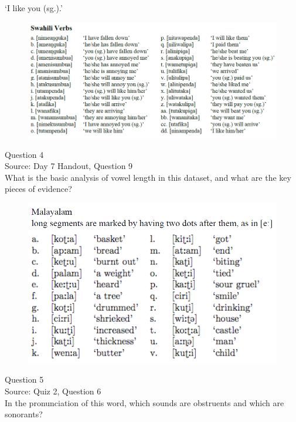 \documentclass[12pt]{article}
\begin{document}
‘I like you (sg.).’

\begin{figure}[H]
\includegraphics{../images/swahiliverbs.png}
\end{figure}

\newpage

{\large Question 4}\\

Source: Day 7 Handout, Question 9\\

What is the basic analysis of vowel length in this dataset, and what are the key pieces of evidence?\\

\begin{figure}[H]
\includegraphics{../images/malayalam.png}
\end{figure}

\newpage

{\large Question 5}\\

Source: Quiz 2, Question 6\\

In the pronunciation of this word, which sounds are obstruents and which are sonorants?\\
\end{document}
